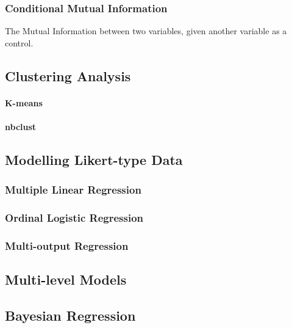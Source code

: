    \subsubsection{Conditional Mutual Information}
   The Mutual Information between two variables, given another variable as a control.

 \subsection{Clustering Analysis}
   \paragraph{K-means}
   \paragraph{nbclust}

 \subsection{Modelling Likert-type Data}

   \subsubsection{Multiple Linear Regression}

   \subsubsection{Ordinal Logistic Regression}

   \subsubsection{Multi-output Regression}

 \subsection{Multi-level Models}

 \subsection{Bayesian Regression}
